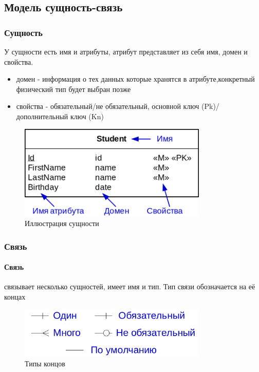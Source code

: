 \subsection{Модель сущность-связь}
\subsubsection{Сущность}
У сущности есть имя и атрибуты, атрибут представляет из себя имя, домен и свойства.
\begin{itemize}
	\item домен - информация о тех данных которые хранятся в атрибуте,конкретный физический тип будет выбран позже
	\item свойства - обязательный/не обязательный, основной ключ (Pk)/дополнительный ключ (Kn)
\end{itemize}

\begin{figure}[h]
	\centering

	\includegraphics[width=0.8\textwidth]{../assets/kgeorgiy/modelling/ERModel_Entity.svg.png}
	\caption{Иллюстрация сущности}
\end{figure}

\subsubsection{Связь}
\paragraph{Связь} связывает несколько сущностей, имеет имя и тип. Тип связи обозначается на её
концах


\begin{figure}[h]
	\centering

	\includegraphics[width=0.8\textwidth]{../assets/kgeorgiy/modelling/ERModel_ArrowEnds.svg.png}
	\caption{Типы концов}
\end{figure}

